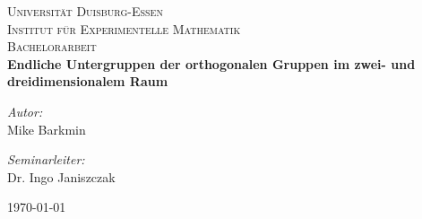 
\begin{titlepage}
\begin{center}


\textsc{\LARGE Universität Duisburg-Essen}\\
\textsc{Institut für Experimentelle Mathematik}\\[1.5cm]

\textsc{\Large Bachelorarbeit}\\[0.5cm]

{ \huge \bfseries Endliche Untergruppen der orthogonalen Gruppen im zwei- und dreidimensionalem Raum \\[0.8cm] }

\begin{minipage}{0.4\textwidth}
\begin{flushleft} \large
\emph{Autor:}\\
Mike Barkmin
\end{flushleft}
\end{minipage}
\begin{minipage}{0.4\textwidth}
\begin{flushright} \large
\emph{Seminarleiter:} \\
Dr. Ingo Janiszczak
\end{flushright}
\end{minipage}

\vfill

{\large \today}
\end{center}
\end{titlepage}